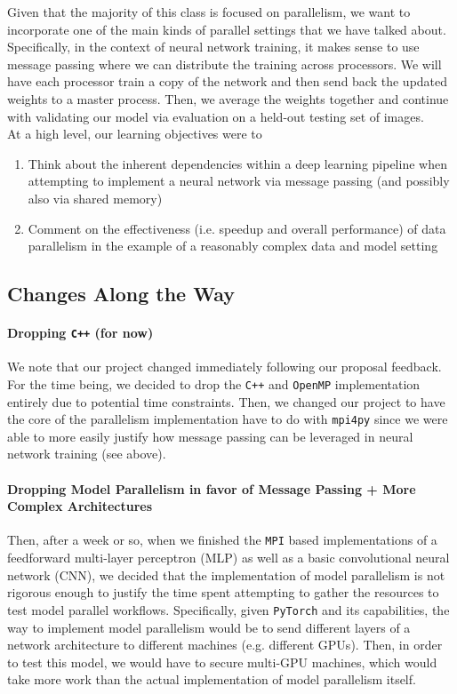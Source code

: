 \documentclass{article}
\begin{document}
Given that the majority of this class is focused on parallelism, we want to incorporate one of the main kinds of parallel settings that we have talked about. Specifically, in the context of neural network training, it makes sense to use message passing where we can distribute the training across processors. We will have each processor train a copy of the network and then send back the updated weights to a master process. Then, we average the weights together and continue with validating our model via evaluation on a held-out testing set of images. \\

\noindent At a high level, our learning objectives were to
\begin{enumerate}
  \item Think about the inherent dependencies within a deep learning pipeline when attempting to implement a neural network via message passing (and possibly also via shared memory)
  \item Comment on the effectiveness (i.e. speedup and overall performance) of data parallelism in the example of a reasonably complex data and model setting
\end{enumerate}

\subsection{Changes Along the Way}

\paragraph{Dropping \texttt{C++} (for now)}

We note that our project changed immediately following our proposal feedback. For the time being, we decided to drop the \texttt{C++} and \texttt{OpenMP} implementation entirely due to potential time constraints. Then, we changed our project to have the core of the parallelism implementation have to do with \texttt{mpi4py} since we were able to more easily justify how message passing can be leveraged in neural network training (see above).

\paragraph{Dropping Model Parallelism in favor of Message Passing + More Complex Architectures}

Then, after a week or so, when we finished the \texttt{MPI} based implementations of a feedforward multi-layer perceptron (MLP) as well as a basic convolutional neural network (CNN), we decided that the implementation of model parallelism is not rigorous enough to justify the time spent attempting to gather the resources to test model parallel workflows. Specifically, given \texttt{PyTorch} and its capabilities, the way to implement model parallelism would be to send different layers of a network architecture to different machines (e.g. different GPUs). Then, in order to test this model, we would have to secure multi-GPU machines, which would take more work than the actual implementation of model parallelism itself.
\end{document}
